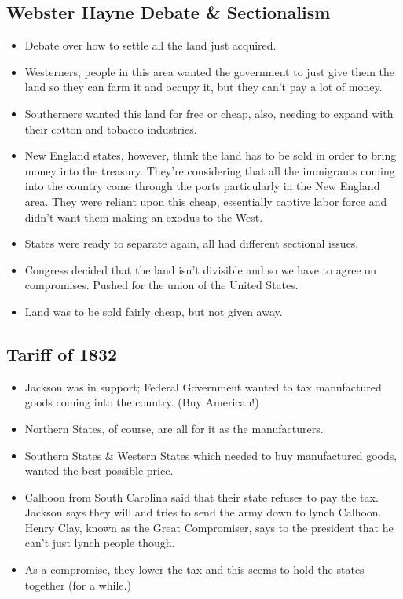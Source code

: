 \documentclass{article}
\begin{document}
      \subsection{Webster Hayne Debate \& Sectionalism}
        \begin{itemize}
          \item Debate over how to settle all the land just acquired.
          \item Westerners, people in this area wanted the government to just give them the land so they can farm it and occupy it, but they can't pay a lot of money.
          \item Southerners wanted this land for free or cheap, also, needing to expand with their cotton and tobacco industries.
          \item New England states, however, think the land has to be sold in order to bring money into the treasury. They're considering that all the immigrants coming into the country come through the ports particularly in the New England area. They were reliant upon this cheap, essentially captive labor force and didn't want them making an exodus to the West.
          \item States were ready to separate again, all had different sectional issues.
          \item Congress decided that the land isn't divisible and so we have to agree on compromises. Pushed for the union of the United States. 
          \item Land was to be sold fairly cheap, but not given away.
        \end{itemize}

      \subsection{Tariff of 1832}
        \begin{itemize}
          \item Jackson was in support; Federal Government wanted to tax manufactured goods coming into the country. (Buy American!)
          \item Northern States, of course, are all for it as the manufacturers.
          \item Southern States \& Western States which needed to buy manufactured goods, wanted the best possible price.
          \item Calhoon from South Carolina said that their state refuses to pay the tax. Jackson says they will and tries to send the army down to lynch Calhoon. Henry Clay, known as the Great Compromiser, says to the president that he can't just lynch people though. 
          \item As a compromise, they lower the tax and this seems to hold the states together (for a while.)
        \end{itemize}
\end{document}
